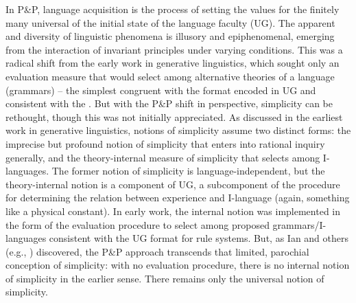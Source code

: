 \documentclass[output=paper]{langsci/langscibook}
\begin{document}
\largerpage
In P\&P, language acquisition is the process of setting the values for the
finitely many universal  of the initial state of the language faculty
(\gls{UG}). The apparent  and diversity of linguistic phenomena is illusory
and epiphenomenal, emerging from the interaction of invariant principles under
varying conditions. This was a radical shift from the early work in generative
linguistics, which sought only an evaluation measure that would select among
alternative theories of a language (grammars) – the simplest congruent with the
format encoded in \gls{UG} and consistent with the . But with
the P\&P shift in perspective, simplicity can be rethought, though this was
not initially appreciated. As discussed in the earliest work in generative
linguistics, notions of simplicity assume two distinct forms: the imprecise but
profound notion of simplicity that enters into rational inquiry generally, and
the theory-internal measure of simplicity that selects among I-languages. The
former notion of simplicity is language-independent, but the theory-internal
notion is a component of \gls{UG}, a subcomponent of the procedure for determining
the relation between experience and I-language (again, something like a
physical constant). In early work, the internal notion was implemented in the
form of the evaluation procedure to select among proposed grammars/I-languages
consistent with the \gls{UG} format for rule systems. But, as Ian \citet{Roberts2012}
and others (e.g., \citealt{SheeBibRobHol2017}) discovered, the P\&P approach
transcends that limited, parochial conception of simplicity: with no evaluation
procedure, there is no internal notion of simplicity in the earlier sense.
There remains only the universal notion of simplicity.
\end{document}

